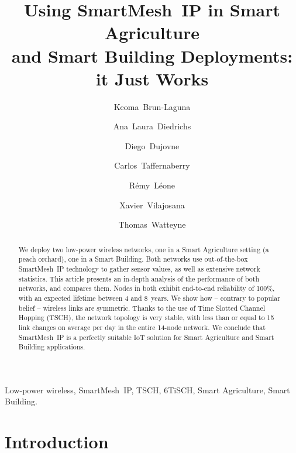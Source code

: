 \documentclass{elsarticle}
\newcommand{\smip}                {SmartMesh~IP\xspace}
\newcommand{\building}            {Smart Building\xspace}
\newcommand{\agri}                {Smart Agriculture\xspace}
\begin{document}
\begin{frontmatter}

\date{}

\title{Using \smip in \agri \\ and \building Deployments: it Just Works}

\author[inria]{Keoma~Brun-Laguna}
\author[utn]{Ana~Laura~Diedrichs}
\author[udp]{Diego~Dujovne}
\author[utn]{Carlos~Taffernaberry}
\author[inria]{R\'emy~L\'eone}
\author[uoc]{Xavier~Vilajosana}
\author[inria]{Thomas~Watteyne}

\address[inria]{~Inria, EVA team, Paris, France}
\address[utn]{~Universidad Tecnol\'ogica Nacional (UTN), Mendoza, Argentina}
\address[udp]{~Universidad Diego Portales, Santiago, Chile}
\address[uoc]{~Universitat Oberta de Catalunya, Barcelona, Catalonia, Spain}

\begin{abstract}
We deploy two low-power wireless networks, one in a \agri setting (a peach orchard), one in a \building.
Both networks use out-of-the-box \smip technology to gather sensor values, as well as extensive network statistics.
This article presents an in-depth analysis of the performance of both networks, and compares them.
Nodes in both exhibit end-to-end reliability of 100\%, with an expected lifetime between 4 and 8~years.
We show how -- contrary to popular belief -- wireless links are symmetric.
Thanks to the use of Time Slotted Channel Hopping (TSCH), the network topology is very stable, with less than or equal to 15 link changes on average per day in the entire 14-node network.
We conclude that \smip is a perfectly suitable IoT solution for \agri and \building applications.
\end{abstract}

\begin{keyword}
Low-power wireless, \smip, TSCH, 6TiSCH, \agri, \building.
\end{keyword}

\end{frontmatter}

\section{Introduction}
\label{sec:intro}
\end{document}
